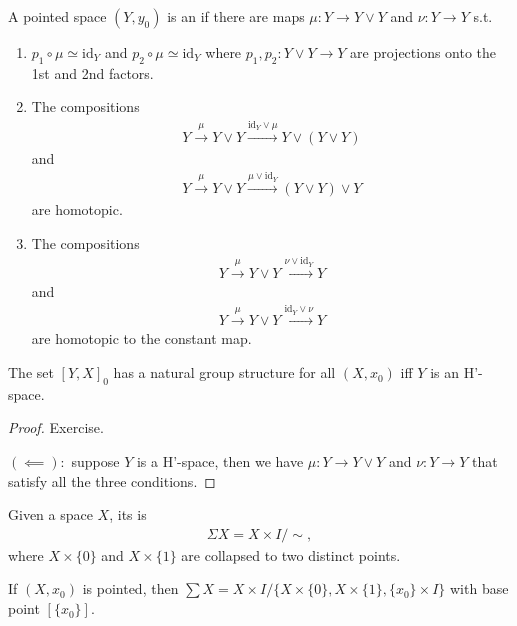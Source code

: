 \documentclass[12pt,class=article,crop=false]{standalone}
\begin{document}
\begin{defn}
A pointed space $ (Y,y_0)$ is an  if there are maps $ \mu: Y \to Y \vee Y$ and $ \nu: Y \to Y$ s.t.\ 
\begin{enumerate}[label=(\arabic*)]
	\item $ p_1 \circ \mu \simeq \text{id}_{ Y}$ and $ p_2 \circ \mu \simeq \text{id}_{ Y}$ where $ p_1, p_2 : Y \vee Y \to Y$ are projections onto the 1st and 2nd factors.
	\item The compositions
		\begin{align*}
			Y \xrightarrow{ \mu} Y \vee Y \xrightarrow{ \text{id}_{ Y} \vee  \mu} Y \vee (Y\vee Y)
		\end{align*}
		and
		\begin{align*}
			Y \xrightarrow{ \mu} Y \vee Y \xrightarrow{ \mu \vee \text{id}_{ Y}} (Y \vee Y) \vee Y 
		\end{align*}
		are homotopic.
	\item The compositions
		\begin{align*}
			Y \xrightarrow{ \mu} Y \vee Y \xrightarrow{\nu \vee  \text{id}_{ Y}}  Y
		\end{align*}
		and
		\begin{align*}
			Y \xrightarrow{ \mu} Y \vee Y \xrightarrow{ \text{id}_{ Y} \vee \nu} Y  
		\end{align*}
		are homotopic to the constant map.
\end{enumerate}
\end{defn}

\begin{thm}
	The set $ [Y, X]_0$ has a natural group structure for all $ (X,x_0)$ iff $ Y$ is an H'-space.
\end{thm}
\begin{proof}
Exercise.

$ (\impliedby):$ suppose $ Y$ is a H'-space, then we have $\mu: Y \to Y \vee Y$ and $ \nu: Y \to Y$ that satisfy all the three conditions. 
\end{proof}

\begin{defn}
Given a space $ X$, its   is
\begin{align*}
	\Sigma X = X \times I / \sim,
\end{align*}
where $ X \times \{0\} $ and $ X \times \{1\} $ are collapsed to two distinct points.
\end{defn}
\begin{remark}
	If $ (X,x_0)$ is pointed, then $ \sum X = X \times I / \{X \times \{0\} , X \times \{1\} , \{x_0\} \times I \} $ with base point $ [\{x_0\}] $.
\end{remark}
\end{document}
